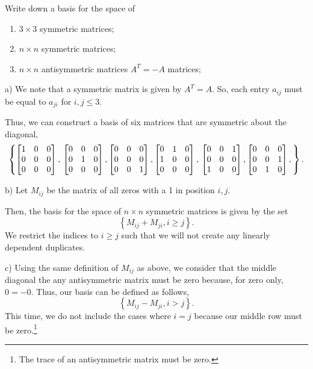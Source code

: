 \documentclass[../hw1]{subfiles}
\begin{document}
Write down a basis for the space of
\begin{enumerate}[label= (\alph*)]
  \item $3\times 3$ symmetric matrices;
  \item $n\times n$ symmetric matrices;
  \item $n\times n$ antisymmetric matrices $A ^{T} = -A$ matrices;
\end{enumerate}

a) We note that a symmetric matrix is given by $A ^{T} = A$.
So, each entry $a_{ij}$ must be equal to $a_{ji}$ for $i,j \le 3$.

Thus, we can construct a basis of six matrices that are symmetric about the diagonal,
\[
  \left\{ 
    \begin{bmatrix} 1&0&0\\0&0&0\\0&0&0 \end{bmatrix}, \\
    \begin{bmatrix} 0&0&0\\0&1&0\\0&0&0 \end{bmatrix},
    \begin{bmatrix} 0&0&0\\0&0&0\\0&0&1 \end{bmatrix},
    \begin{bmatrix} 0&1&0\\1&0&0\\0&0&0 \end{bmatrix}, \\
    \begin{bmatrix} 0&0&1\\0&0&0\\1&0&0 \end{bmatrix},
    \begin{bmatrix} 0&0&0\\0&0&1\\0&1&0 \end{bmatrix},
  \right\}
.\] 

b) Let $M_{ij}$ be the matrix of all zeros with a 1 in position $i,j$.

Then, the basis for the space of $n\times n$ symmetric matrices is given by the set \[
  \left\{ M_{ij}+M_{ji}, i \ge j \right\}
.\] We restrict the indices to $i \ge j$ such that we will not create any linearly dependent duplicates.

c) Using the same definition of $M_{ij}$ as above, we consider that the middle diagonal the any antisymmetric matrix must be zero because, for zero only, $0=-0$. Thus, our basis can be defined as follows,  \[
\left\{ M_{ij} - M_{ji}, i > j \right\}
.\]  This time, we do not include the cases where $i=j$ because our middle row must be zero.\footnote{The trace of an antisymmetric matrix must be zero.}
\end{document}
